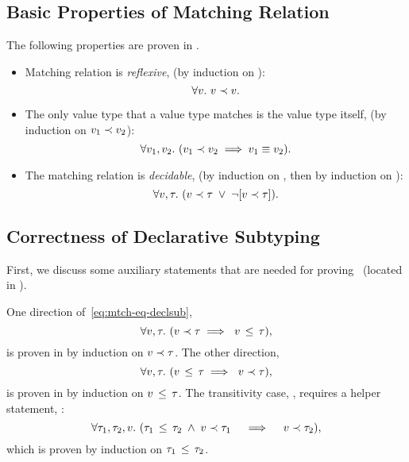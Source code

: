 \subsection{Basic Properties of Matching Relation}

The following properties are proven in .

\begin{itemize}
  \item Matching relation is \emph{reflexive}, 
    (by induction on \vty):
    \[\forall \vty.\ \bjmtch{\vty}{\vty}.\]
  \item The only value type that a value type matches is the value type itself,
    (by induction on $v_1 \prec v_2$):
    \[\forall v_1, v_2.\ (v_1 \prec v_2 \implies 
    v_1 \equiv v_2).\]
  \item The matching relation is \emph{decidable}, 
    (by induction on \vty, then by induction on \ty):
    \[\forall \vty, \ty.\ 
    (\bjmtch{\vty}{\ty}\; \lor\; \lnot [\bjmtch{\vty}{\ty}]).\]
\end{itemize}

\subsection{Correctness of Declarative Subtyping}

First, we discuss some auxiliary statements 
that are needed for proving~
(located in ).

One direction of~\eqref{eq:mtch-eq-declsub},
\begin{equation}\label{eq:mtch-imp-declsub}
\forall \vty, \ty.\ (\bjmtch{\vty}{\ty} \implies\ \bjsub{\vty}{\ty}),
\end{equation}
is proven in  
by induction on $v \prec \tau$.
The other direction,
\[
\forall v, \tau.\ (v \, \leq \, \tau \implies\ v \prec \tau),
\]
is proven in 
by induction on $v \, \leq \, \tau$.
The transitivity case, , requires a helper statement,
:
\begin{equation}\label{eq:mtch-trans}
\forall \ty_1, \ty_2, \vty.\ 
(\bjsub{\ty_1}{\ty_2}\; \land\; \bjmtch{\vty}{\ty_1} \quad \implies \quad
\bjmtch{\vty}{\ty_2}),
\end{equation}
which is proven by induction on $\tau_1 \, \leq \, \tau_2$.

